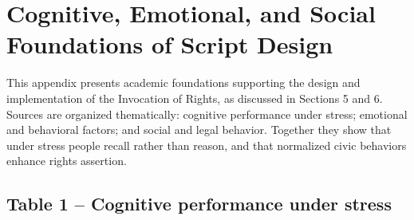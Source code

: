 \section{Cognitive, Emotional, and Social Foundations of Script Design}

This appendix presents academic foundations supporting the design and implementation of the Invocation of Rights, as discussed in Sections 5 and 6. Sources are organized thematically: cognitive performance under stress; emotional and behavioral factors; and social and legal behavior. Together they show that under stress people recall rather than reason, and that normalized civic behaviors enhance rights assertion.

\setlength{\LTpre}{3pt}
\setlength{\LTpost}{3pt}

\subsection*{Table 1 – Cognitive performance under stress}


